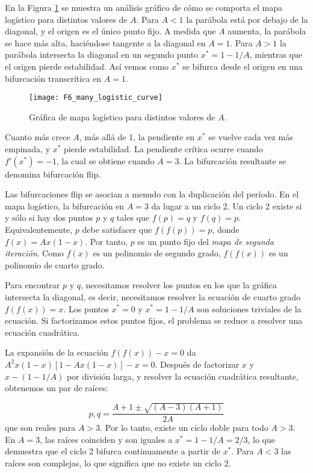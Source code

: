             En la Figura \ref{fig:F6_many_logistic_curve} se muestra un análisis gráfico de cómo se comporta el mapa logístico para distintos valores de $A$. Para $A < 1$ la parábola está por debajo de la diagonal, y el origen es el único punto fijo. A medida que $A$ aumenta, la parábola se hace más alta, haciéndose tangente a la diagonal en $A = 1$. Para $A > 1$ la parábola intersecta la diagonal en un segundo punto $x^{*} = 1 - 1/A$, mientras que el origen pierde estabilidad. Así vemos como $x^{*}$ se bifurca desde el origen en una bifurcación transcrítica en $A = 1$. 

            \begin{figure}[hbtp]
                \caption{Gráfica de mapa logístico para distintos valores de $A$.}
                \centering
                \texttt{[image: F6\_many\_logistic\_curve]}
                \label{fig:F6_many_logistic_curve}
            \end{figure}
            
            Cuanto más crece $A$, más allá de 1, la pendiente en $x^{*}$ se vuelve cada vez más empinada, y $x^{*}$ pierde estabilidad. La pendiente crítica ocurre cuando $f'(x^{*}) = -1$, la cual se obtiene cuando $A = 3$. La bifurcación resultante se denomina bifurcación flip.

            Las bifurcaciones flip se asocian a menudo con la duplicación del período. En el mapa logístico, la bifurcación en $A = 3$ da lugar a un ciclo 2. Un ciclo 2 existe si y sólo si hay dos puntos $p$ y $q$ tales que $f(p) = q$  y $f(q) = p$. Equivalentemente, $p$ debe satisfacer que $f(f(p)) = p$, donde $f(x) = Ax (1 - x)$. Por tanto, $p$ es un punto fijo del \emph{mapa de segunda iteración}. Como $f(x)$ es un polinomio de segundo grado, $f(f(x))$ es un polinomio de cuarto grado.

            Para encontrar $p$ y $q$, necesitamos resolver los puntos en los que la gráfica intersecta la diagonal, es decir, necesitamos resolver la ecuación de cuarto grado $f(f(x)) = x$. Los puntos $x^{*} = 0$ y $x^{*} = 1 - 1/A$ son soluciones triviales de la ecuación. Si factorizamos estos puntos fijos, el problema se reduce a resolver una ecuación cuadrática. 

            La expansión de la ecuación $f(f(x)) -x = 0$ da $A^{2}x(1-x) [1 - Ax(1-x)] -x = 0$. Después de factorizar $x$ y $x - (1-1/A)$ por división larga, y resolver la ecuación cuadrática resultante, obtenemos un par de raíces:

            \begin{equation}
                p,q = \frac{A + 1 \pm \sqrt{(A-3) (A+1)} }{2A} 
            \end{equation}
            que son reales para $A > 3$. Por lo tanto, existe un ciclo doble para todo $ A > 3 $. En $ A = 3 $, las raíces coinciden y son iguales a $x^{*} = 1 - 1/A = 2/3$, lo que demuestra que el ciclo 2 bifurca continuamente a partir de $x^{*}$. Para $A < 3$ las raíces son complejas, lo que significa que no existe un ciclo 2.


